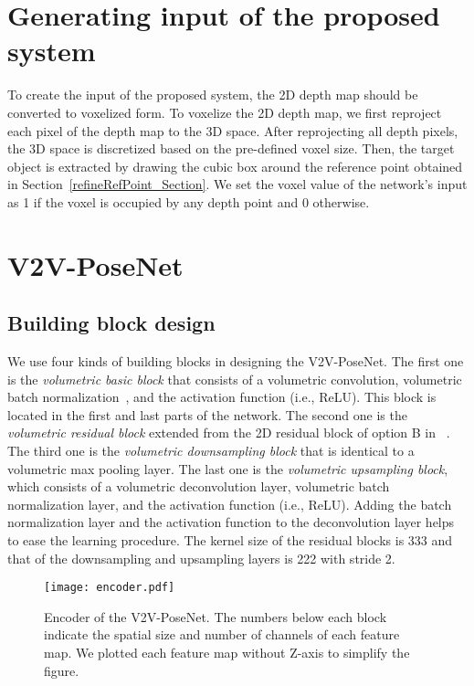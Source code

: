 \documentclass[10pt,twocolumn,letterpaper]{article}
\begin{document}
\section{Generating input of the proposed system}

To create the input of the proposed system, the 2D depth map should be converted to voxelized form. To voxelize the 2D depth map, we first reproject each pixel of the depth map to the 3D space. After reprojecting all depth pixels, the 3D space is discretized based on the pre-defined voxel size. Then, the target object is extracted by drawing the cubic box around the reference point obtained in Section~\ref{refineRefPoint_Section}. We set the voxel value of the network's input  as 1 if the voxel is occupied by any depth point and 0 otherwise.
 \section{V2V-PoseNet}
\label{V2V-PoseNet_Section}

\subsection{Building block design}
We use four kinds of building blocks in designing the V2V-PoseNet. The first one is the \emph{volumetric basic block} that consists of a volumetric convolution, volumetric batch normalization~\cite{ioffe2015batch}, and the activation function (i.e., ReLU). This block is located in the first and last parts of the network. The second one is the \emph{volumetric residual block} extended from the 2D residual block of option B in ~\cite{he2016deep}. The third one is the \emph{volumetric downsampling block} that is identical to a volumetric max pooling layer. The last one is the \emph{volumetric upsampling block}, which consists of a volumetric deconvolution layer, volumetric batch normalization layer, and the activation function (i.e., ReLU). Adding the batch normalization layer and the activation function to the deconvolution layer helps to ease the learning procedure. The kernel size of the residual blocks is 333 and that of the downsampling and upsampling layers is 222 with stride 2.


\begin{figure}[t]
\begin{center}
   \texttt{[image: encoder.pdf]}
\end{center}
\vspace*{-5mm}
   \caption{Encoder of the V2V-PoseNet. The numbers below each block indicate the spatial size and number of channels of each feature map. We plotted each feature map without Z-axis to simplify the figure.}
\vspace*{-4mm}
\label{fig:encoder}
\end{figure}
\end{document}
